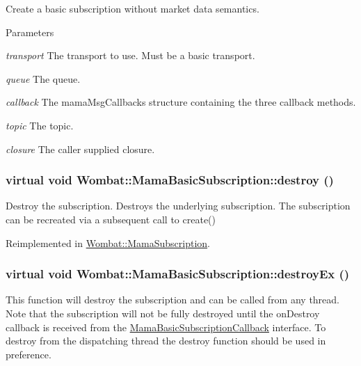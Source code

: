Create a basic subscription without market data semantics. 
\begin{DoxyParams}{Parameters}
\item[{\em transport}]The transport to use. Must be a basic transport. \item[{\em queue}]The queue. \item[{\em callback}]The mamaMsgCallbacks structure containing the three callback methods.\item[{\em topic}]The topic. \item[{\em closure}]The caller supplied closure. \end{DoxyParams}
\hypertarget{classWombat_1_1MamaBasicSubscription_a296c25c10faa885e408e064a626ce3dd}{
\subsubsection[{destroy}]{\setlength{\rightskip}{0pt plus 5cm}virtual void Wombat::MamaBasicSubscription::destroy ()}}
\label{classWombat_1_1MamaBasicSubscription_a296c25c10faa885e408e064a626ce3dd}


Destroy the subscription. Destroys the underlying subscription. The subscription can be recreated via a subsequent call to create() 

Reimplemented in \hyperlink{classWombat_1_1MamaSubscription_a331eee861f0185e564bcceac3aedde24}{Wombat::MamaSubscription}.\hypertarget{classWombat_1_1MamaBasicSubscription_aa00ed63c4f538d8abb21255abace5ffb}{
\subsubsection[{destroyEx}]{\setlength{\rightskip}{0pt plus 5cm}virtual void Wombat::MamaBasicSubscription::destroyEx ()}}
\label{classWombat_1_1MamaBasicSubscription_aa00ed63c4f538d8abb21255abace5ffb}


This function will destroy the subscription and can be called from any thread. Note that the subscription will not be fully destroyed until the onDestroy callback is received from the \hyperlink{classWombat_1_1MamaBasicSubscriptionCallback}{MamaBasicSubscriptionCallback} interface. To destroy from the dispatching thread the destroy function should be used in preference. 

